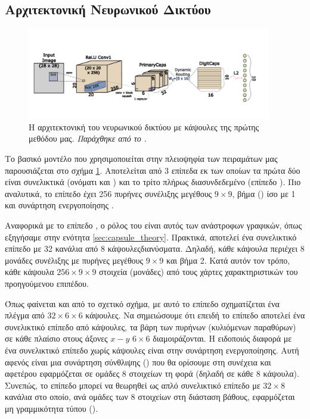 \subsection{Αρχιτεκτονική Νευρωνικού Δικτύου}

\begin{figure}[h]
    \centering
    \includegraphics[width=0.95\textwidth]{images/chapter method/first_method_architecture_encoder.pdf}
    \caption{Η αρχιτεκτονική του νευρωνικού δικτύου με κάψουλες της πρώτης μεθόδου μας. \textit{Παράχθηκε από το \href{https://inkscape.org/}{}}.}
    \label{fig:method_1_architecture}
  \end{figure}

Το βασικό μοντέλο που χρησιμοποιείται στην πλειοψηφία των πειραμάτων μας παρουσιάζεται στο σχήμα \ref{fig:method_1_architecture}. Αποτελείται από 3 επίπεδα εκ των οποίων τα πρώτα δύο είναι συνελικτικά (ονόματι  και ) και το τρίτο πλήρως διασυνδεδεμένο (επίπεδο ). Πιο αναλυτικά, το επίπεδο  έχει 256 πυρήνες συνέλιξης μεγέθους $9 \times 9$, βήμα () ίσο με 1 και συνάρτηση ενεργοποίησης .\par

Αναφορικά με το επίπεδο , ο ρόλος του είναι αυτός των ανάστροφων γραφικών, όπως εξηγήσαμε στην ενότητα \ref{sec:capsule_theory}. Πρακτικά, αποτελεί ένα συνελικτικό επίπεδο με 32 κανάλια από 8 κάψουλες\textendash διανύσματα. Δηλαδή, κάθε κάψουλα περιέχει 8 μονάδες συνέλιξης με πυρήνες μεγέθους $9 \times 9$ και βήμα 2. Κατά αυτόν τον τρόπο, κάθε κάψουλα  $256 \times 9 \times 9$ στοιχεία (μονάδες) από τους χάρτες χαρακτηριστικών του προηγούμενου επιπέδου.\par

Όπως φαίνεται και από το σχετικό σχήμα, με αυτό το επίπεδο σχηματίζεται ένα πλέγμα από $32 \times 6 \times 6$ κάψουλες. Να σημειώσουμε ότι επειδή το επίπεδο  αποτελεί ένα συνελικτικό επίπεδο από κάψουλες, τα βάρη των πυρήνων (κυλιόμενων παραθύρων) σε κάθε πλαίσιο στους άξονες $x-y$ $6 \times 6$ διαμοιράζονται. Η ειδοποιός διαφορά με ένα συνελικτικό επίπεδο χωρίς κάψουλες είναι στην συνάρτηση ενεργοποίησης. Αυτή αφενός είναι μια συνάρτηση σύνθλιψης () που θα ορίσουμε στη συνέχεια και αφετέρου εφαρμόζεται σε ομάδες 8 στοιχείων τη φορά (δηλαδή σε κάθε 8 κάψουλα). Συνεπώς, το επίπεδο  μπορεί να θεωρηθεί ως απλό συνελικτικό επίπεδο με $32 \times 8$ κανάλια στο οποίο, ανά ομάδες των 8 στοιχείων στη διάσταση βάθους, εφαρμόζεται μη γραμμικότητα τύπου  ().\par

